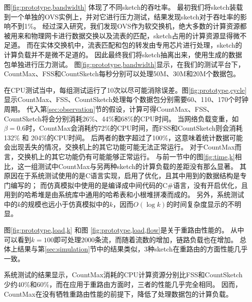 图\ref{fig:prototype,bandwidth} 体现了不同sketch的吞吐率。
最初我们将sketch装载到一个单独的OVS实例上，并对它进行压力测试，结果发现sketch对于吞吐率的影响不到1\%。
经过深入研究，我们发现OVS作为软交换机，绝大多数的计算资源都被用来和物理网卡进行数据交换以及流表的匹配，sketch占用的计算资源显得微不足道。
而在实体交换机中，流表匹配和包的转发由专用芯片进行处理，sketch的计算负载并不是微不足道的。
因此最终我们将sketch抽离出来，使用生成的数据包单独进行压力测试。
图\ref{fig:prototype,bandwidth}显示，在我们的测试平台下，CountMax、FSS和CountSketch每秒分别可以处理50M、30M和20M个数据包。

在CPU测试当中，每组测试运行了10次以尽可能消除误差。图\ref{fig:prototype,cycle}显示CountMax、FSS、CountSketch处理每个数据包分别需要60、110、170个时钟周期。
代入第\ref{sec:observation}节的假设，计算可得CountMax、FSS、CountSketch将会分别消耗26\%、44\%和68\%的CPU时间。
当网络负载变重，如$\beta=0.6$时，CountMax会消耗约72\%的CPU时间，而FSS和CountSketch则会消耗132\% 和 204\%的CPU时间。
后两者的数字超过了100\%，这意味着统计数据可能会出现丢失的情况，交换机上的其它功能可能无法正常运行。
对于CountMax而言，交换机上的其它功能仍有可能能够正常运行。
与前一节中的图\ref{fig:time,k}相比，这一组测试中CountMax与另两种sketch的计算负载的差距没有那么显著。
其原因在于系统测试使用的是C语言实现，启用了优化，且其中用到的数据结构是专门编写的；
而仿真模拟中使用的是编译成中间代码的C\#语言，没有开启优化，且用到的哈希堆是由系统库中通用的哈希表和小根堆拼凑而成的。
另外，系统测试中的$k$的规模也远小于仿真模拟中的$k$，因而$O(\log{k})$的时间复杂度显示的不明显。

图\ref{fig:prototype,load,k} 和图 \ref{fig:prototype,load,flow}是关于重路由性能的。
从中可以看到$k=100$即可处理2000条流，而随着流数的增加，链路负载也在增加。
总体上结果与第\ref{sec:simulation}节中的结果类似，3种sketch在重路由的方面性能几乎一致。

系统测试的结果显示，CountMax消耗的CPU计算资源分别比FSS和CountSketch少约40\%和60\%，而在应用于重路由方面时，三者的性能几乎完全相同。
因而，CountMax在没有牺牲重路由性能的前提下，降低了处理数据包的计算负载。
